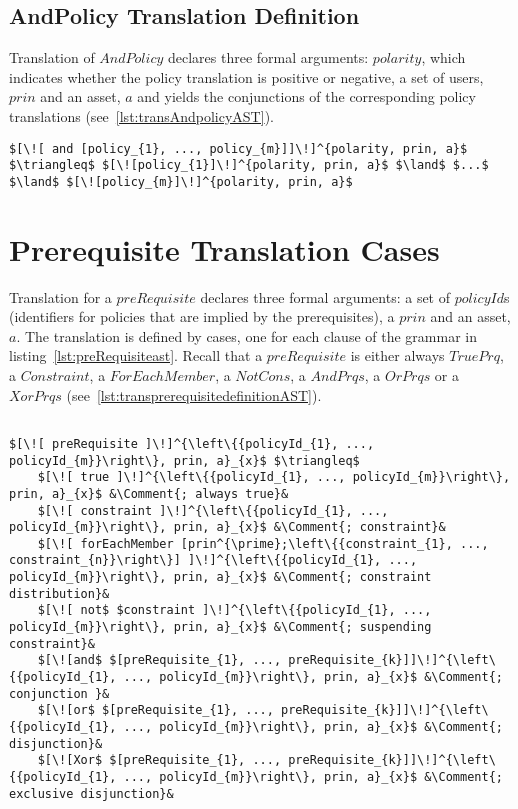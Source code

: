 \subsection{AndPolicy Translation Definition}
Translation of $AndPolicy$ declares three formal arguments: $polarity$, which indicates whether the policy translation is positive or negative, a set of users, $prin$ and an asset, $a$ and yields the conjunctions of the corresponding policy translations (see~\ref{lst:transAndpolicyAST}). 

\lstset{mathescape, language=AST}  
\begin{lstlisting}[frame=single, caption={Policy Translation Definition {$\colon$} AndPolicy},label={lst:transAndpolicyAST}]
$[\![ and [policy_{1}, ..., policy_{m}]]\!]^{polarity, prin, a}$ $\triangleq$ $[\![policy_{1}]\!]^{polarity, prin, a}$ $\land$ $...$ $\land$ $[\![policy_{m}]\!]^{polarity, prin, a}$

\end{lstlisting}




\section{Prerequisite Translation Cases}

Translation for a $preRequisite$ declares three formal arguments: a set of $policyId$s (identifiers for policies that are implied by the prerequisites), a $prin$ and an asset, $a$. The translation is defined by cases, one for each clause of the grammar in listing~\ref{lst:preRequisiteast}. Recall that a $preRequisite$ is either always $TruePrq$, a $Constraint$, a $ForEachMember$, a $NotCons$, a $AndPrqs$, a $OrPrqs$ or a $XorPrqs$ (see~\ref{lst:transprerequisitedefinitionAST}). 

\lstset{mathescape, language=AST}  
\begin{lstlisting}[frame=single, caption={Prerequisite Translation Cases},label={lst:transprerequisitedefinitionAST}]

$[\![ preRequisite ]\!]^{\left\{{policyId_{1}, ..., policyId_{m}}\right\}, prin, a}_{x}$ $\triangleq$
    $[\![ true ]\!]^{\left\{{policyId_{1}, ..., policyId_{m}}\right\}, prin, a}_{x}$ &\Comment{; always true}&
    $[\![ constraint ]\!]^{\left\{{policyId_{1}, ..., policyId_{m}}\right\}, prin, a}_{x}$ &\Comment{; constraint}&      
    $[\![ forEachMember [prin^{\prime};\left\{{constraint_{1}, ..., constraint_{n}}\right\}] ]\!]^{\left\{{policyId_{1}, ..., policyId_{m}}\right\}, prin, a}_{x}$ &\Comment{; constraint distribution}&
    $[\![ not$ $constraint ]\!]^{\left\{{policyId_{1}, ..., policyId_{m}}\right\}, prin, a}_{x}$ &\Comment{; suspending constraint}&
    $[\![and$ $[preRequisite_{1}, ..., preRequisite_{k}]]\!]^{\left\{{policyId_{1}, ..., policyId_{m}}\right\}, prin, a}_{x}$ &\Comment{; conjunction }&
    $[\![or$ $[preRequisite_{1}, ..., preRequisite_{k}]]\!]^{\left\{{policyId_{1}, ..., policyId_{m}}\right\}, prin, a}_{x}$ &\Comment{; disjunction}&
    $[\![Xor$ $[preRequisite_{1}, ..., preRequisite_{k}]]\!]^{\left\{{policyId_{1}, ..., policyId_{m}}\right\}, prin, a}_{x}$ &\Comment{; exclusive disjunction}&

\end{lstlisting}

